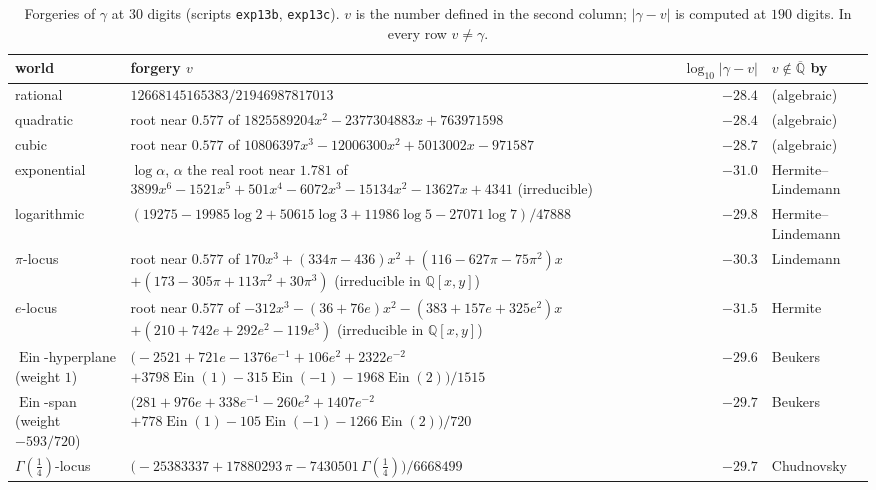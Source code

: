 \documentclass[11pt,a4paper]{article}
\newcommand{\Q}{\mathbb Q}
\newcommand{\Qbar}{\overline{\mathbb Q}}
\newcommand{\Ein}{\operatorname{Ein}}
\theoremstyle{definition}
\theoremstyle{remark}
\numberwithin{equation}{section}
\begin{document}
\begin{table}[t]
\centering\footnotesize
\caption{Forgeries of $\gamma$ at $30$ digits (scripts \texttt{exp13b}, \texttt{exp13c}). $v$ is
the number defined in the second column; $|\gamma-v|$ is computed at $190$ digits. In every
row $v\ne\gamma$.}
\label{V:tab:gallery30}
\begin{tabular}{@{}>{\raggedright\arraybackslash}p{17mm}>{\raggedright\arraybackslash}p{86mm}r>{\raggedright\arraybackslash}p{22mm}@{}}
\toprule
world & forgery $v$ & $\log_{10}|\gamma-v|$ & $v\notin\Qbar$ by\\
\midrule
rational & $12668145165383/21946987817013$ & $-28.4$ & (algebraic)\\
quadratic & root near $0.577$ of $1825589204x^2-2377304883x+763971598$ & $-28.4$ & (algebraic)\\
cubic & root near $0.577$ of $10806397x^3-12006300x^2+5013002x-971587$ & $-28.7$ & (algebraic)\\
exponential & $\log\alpha$, $\alpha$ the real root near $1.781$ of
 $3899x^6-1521x^5+501x^4-6072x^3-15134x^2-13627x+4341$ (irreducible) & $-31.0$ & Hermite--Lindemann\\
logarithmic & $(19275-19985\log2+50615\log3+11986\log5-27071\log7)/47888$ & $-29.8$ & Hermite--Lindemann\\
$\pi$-locus & root near $0.577$ of $170x^3+(334\pi-436)x^2+(116-627\pi-75\pi^2)x$ $+(173-305\pi+113\pi^2+30\pi^3)$ (irreducible in $\Q[x,y]$) & $-30.3$ & Lindemann\\
$e$-locus & root near $0.577$ of $-312x^3-(36+76e)x^2-(383+157e+325e^2)x$ $+(210+742e+292e^2-119e^3)$ (irreducible in $\Q[x,y]$) & $-31.5$ & Hermite\\
$\Ein$-hyperplane (weight $1$) & $\bigl(-2521+721e-1376e^{-1}+106e^{2}+2322e^{-2}$ $+3798\Ein(1)-315\Ein(-1)-1968\Ein(2)\bigr)/1515$ & $-29.6$ & Beukers\\
$\Ein$-span (weight $-593/720$) & $\bigl(281+976e+338e^{-1}-260e^{2}+1407e^{-2}$ $+778\Ein(1)-105\Ein(-1)-1266\Ein(2)\bigr)/720$ & $-29.7$ & Beukers\\
$\Gamma(\tfrac14)$-locus & $\bigl(-25383337+17880293\,\pi-7430501\,\Gamma(\tfrac14)\bigr)/6668499$ & $-29.7$ & Chudnovsky\\
\bottomrule
\end{tabular}
\end{table}
\end{document}
